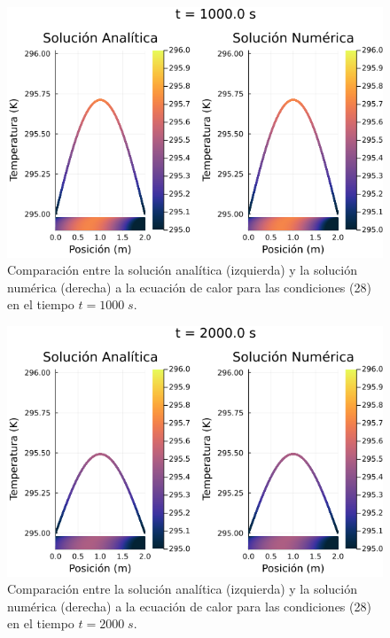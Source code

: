 \documentclass[12pt]{article}
\begin{document}
\begin{figure}[H]
\begin{center}
    \includegraphics[width=0.79\linewidth]{Ejemplo_01_t_1.png}
    \caption{Comparación entre la solución analítica (izquierda) y la solución numérica (derecha) a la ecuación de calor para las condiciones (28) en el tiempo $t=1000 \; s$.}
\end{center}
\end{figure}

\begin{figure}[H]
\begin{center}
    \includegraphics[width=0.79\linewidth]{Ejemplo_01_t_2.png}
    \caption{Comparación entre la solución analítica (izquierda) y la solución numérica (derecha) a la ecuación de calor para las condiciones (28) en el tiempo $t=2000 \; s$.}
\end{center}
\end{figure}
\end{document}

